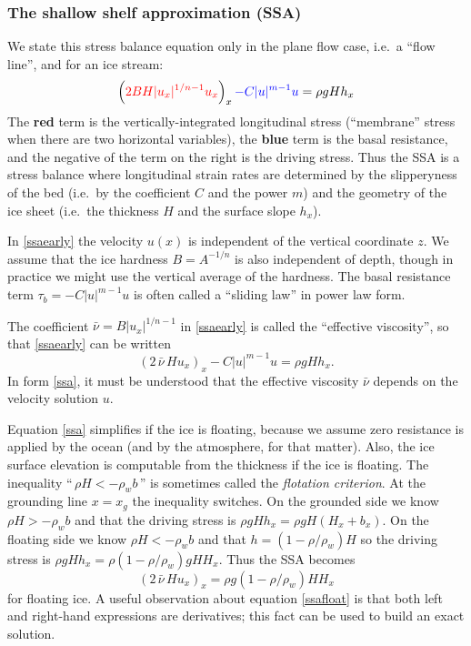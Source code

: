\documentclass[titlepage,a4paper,final,12pt]{scrartcl}
\begin{document}
\subsubsection*{The shallow shelf approximation (SSA)}  We state this stress balance equation only in the plane flow case, i.e.~a ``flow line'', and for an ice stream:
\begin{equation}
  \left({\color{red} 2 B H |u_x|^{1/n - 1} u_x}\right)_x {\color{blue} - C|u|^{m-1}u} = \rho g H h_x \label{ssaearly}
\end{equation}
The {\color{red} \textbf{red} term} is the vertically-integrated longitudinal stress (``membrane'' stress when there are two horizontal variables), the {\color{blue} \textbf{blue} term} is the basal resistance, and the negative of the term on the right is the driving stress.  Thus the SSA is a stress balance where longitudinal strain rates are determined by the slipperyness of the bed (i.e.~by the coefficient $C$ and the power $m$) and the geometry of the ice sheet (i.e.~the thickness $H$ and the surface slope $h_x$).

In \eqref{ssaearly} the velocity $u(x)$ is independent of the vertical coordinate $z$.  We assume that the ice hardness $B=A^{-1/n}$ is also independent of depth, though in practice we might use the vertical average of the hardness.  The basal resistance term $\tau_b = - C|u|^{m-1}u$ is often called a ``sliding law'' in power law form.

The coefficient $\bar \nu = B |u_x|^{1/n-1}$ in \eqref{ssaearly} is called the ``effective viscosity'', so that \eqref{ssaearly} can be written
\begin{equation}
  \left(2 \,\bar \nu\, H u_x\right)_x - C |u|^{m-1} u = \rho g H h_x.  \label{ssa}
\end{equation}
In form \eqref{ssa}, it must be understood that the effective viscosity $\bar\nu$ depends on the velocity solution $u$.

Equation \eqref{ssa} simplifies if the ice is floating, because we assume zero resistance is applied by the ocean (and by the atmosphere, for that matter).  Also, the ice surface elevation is computable from the thickness if the ice is floating.  The inequality ``$\,\rho H < - \rho_w b\,$'' is sometimes called the \emph{flotation criterion}.  At the grounding line $x=x_g$ the inequality switches.  On the grounded side we know $\rho H > - \rho_w b$ and that the driving stress is $\rho g H h_x = \rho g H (H_x + b_x)$.  On the floating side we know $\rho H < - \rho_w b$ and that $h = (1-\rho/\rho_w) H$ so the driving stress is $\rho g H h_x = \rho(1-\rho/\rho_w) g H H_x$.  Thus the SSA becomes
\begin{equation}
   \left(2 \,\bar\nu\, H u_x\right)_x = \rho g (1-\rho/\rho_w) H H_x \label{ssafloat}
\end{equation}
for floating ice.  A useful observation about equation \eqref{ssafloat} is that both left and right-hand expressions are derivatives; this fact can be used to build an exact solution.
\end{document}
